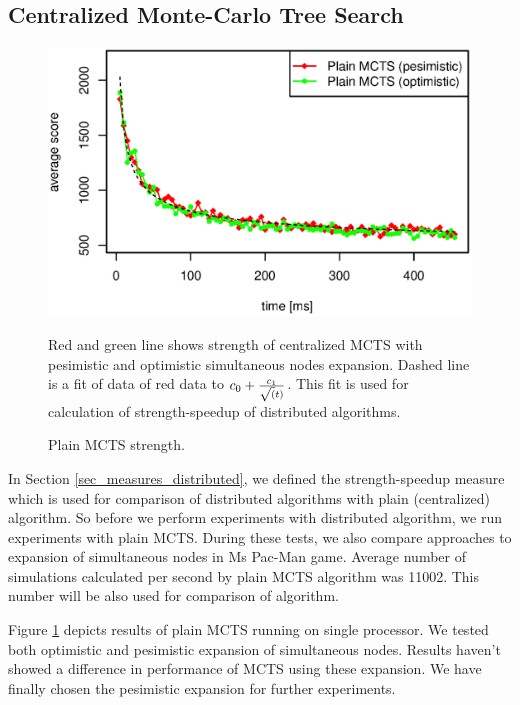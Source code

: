 \subsection{Centralized Monte-Carlo Tree Search}


\begin{figure}
\begin{center}
\includegraphics[width=14cm]{img/plain-mcts-strength.eps}
\end{center}
\caption{\footnotesize Plain MCTS strength.}{\footnotesize Red and green line shows strength 
of centralized MCTS with pesimistic and optimistic simultaneous nodes expansion. Dashed line is
a fit of data of red data to $c_0 + { c_1 \over \sqrt(t) }$. This fit is used for calculation
of strength-speedup of distributed algorithms.}
\label{fig_plain_mcts_strength}
\end{figure}


In Section \ref{sec_measures_distributed}, we defined the strength-speedup measure which
is used for comparison of distributed algorithms with plain (centralized) algorithm. So 
before we perform experiments with distributed algorithm, we run experiments with plain MCTS.
During these tests, we also compare approaches to expansion of simultaneous nodes in Ms Pac-Man
game. Average number of simulations calculated per second by plain MCTS algorithm was 11002.
This number will be also used for comparison of algorithm.

Figure \ref{fig_plain_mcts_strength} depicts results of plain MCTS running on single processor.
We tested both optimistic and pesimistic expansion of simultaneous nodes. Results haven't
showed a difference in performance of MCTS using these expansion. We have finally chosen
the pesimistic expansion for further experiments.


